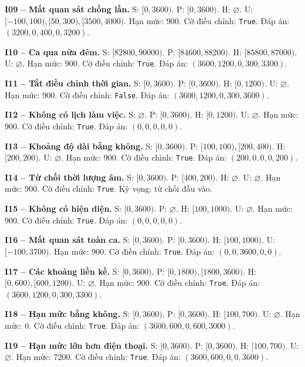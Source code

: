 \noindent\textbf{I09 -- Mất quan sát chồng lấn.}
S: $[0,3600)$.
P: $[0,3600)$.
H: $\varnothing$.
U: $[-100,100), [50,300), [3500,4000)$.
Hạn mức: 900. Cờ điều chỉnh: \texttt{True}. Đáp án: $(3200, 0, 400, 0, 3200)$.

\noindent\textbf{I10 -- Ca qua nửa đêm.}
S: $[82800,90000)$.
P: $[84600,88200)$.
H: $[85800,87000)$.
U: $\varnothing$.
Hạn mức: 900. Cờ điều chỉnh: \texttt{True}. Đáp án: $(3600, 1200, 0, 300, 3300)$.

\noindent\textbf{I11 -- Tắt điều chỉnh thời gian.}
S: $[0,3600)$.
P: $[0,3600)$.
H: $[0,1200)$.
U: $\varnothing$.
Hạn mức: 900. Cờ điều chỉnh: \texttt{False}. Đáp án: $(3600, 1200, 0, 300, 3600)$.

\noindent\textbf{I12 -- Không có lịch làm việc.}
S: $\varnothing$.
P: $[0,3600)$.
H: $[0,1200)$.
U: $\varnothing$.
Hạn mức: 900. Cờ điều chỉnh: \texttt{True}. Đáp án: $(0, 0, 0, 0, 0)$.

\noindent\textbf{I13 -- Khoảng độ dài bằng không.}
S: $[0,3600)$.
P: $[100,100), [200,400)$.
H: $[200,200)$.
U: $\varnothing$.
Hạn mức: 900. Cờ điều chỉnh: \texttt{True}. Đáp án: $(200, 0, 0, 0, 200)$.

\noindent\textbf{I14 -- Từ chối thời lượng âm.}
S: $[0,3600)$.
P: $[400,200)$.
H: $\varnothing$.
U: $\varnothing$.
Hạn mức: 900. Cờ điều chỉnh: \texttt{True}. Kỳ vọng: từ chối đầu vào.

\noindent\textbf{I15 -- Không có hiện diện.}
S: $[0,3600)$.
P: $\varnothing$.
H: $[100,1000)$.
U: $\varnothing$.
Hạn mức: 900. Cờ điều chỉnh: \texttt{True}. Đáp án: $(0, 0, 0, 0, 0)$.

\noindent\textbf{I16 -- Mất quan sát toàn ca.}
S: $[0,3600)$.
P: $[0,3600)$.
H: $[100,1000)$.
U: $[-100,3700)$.
Hạn mức: 900. Cờ điều chỉnh: \texttt{True}. Đáp án: $(0, 0, 3600, 0, 0)$.

\noindent\textbf{I17 -- Các khoảng liền kề.}
S: $[0,3600)$.
P: $[0,1800), [1800,3600)$.
H: $[0,600), [600,1200)$.
U: $\varnothing$.
Hạn mức: 900. Cờ điều chỉnh: \texttt{True}. Đáp án: $(3600, 1200, 0, 300, 3300)$.

\noindent\textbf{I18 -- Hạn mức bằng không.}
S: $[0,3600)$.
P: $[0,3600)$.
H: $[100,700)$.
U: $\varnothing$.
Hạn mức: 0. Cờ điều chỉnh: \texttt{True}. Đáp án: $(3600, 600, 0, 600, 3000)$.

\noindent\textbf{I19 -- Hạn mức lớn hơn điện thoại.}
S: $[0,3600)$.
P: $[0,3600)$.
H: $[100,700)$.
U: $\varnothing$.
Hạn mức: 7200. Cờ điều chỉnh: \texttt{True}. Đáp án: $(3600, 600, 0, 0, 3600)$.

